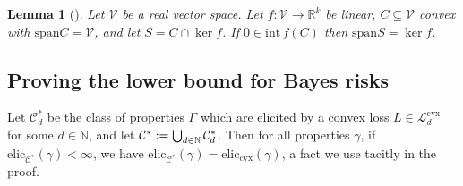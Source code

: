 \documentclass{article} %
\newcommand{\Comments}{0}
\newcommand{\mytodo}[2]{\ifnum\Comments=1%
	\todo[linecolor=#1!80!black,backgroundcolor=#1,bordercolor=#1!80!black]{#2}\fi}
\newcommand{\btw}[1]{}%
\newcommand{\reals}{\mathbb{R}}
\newcommand{\interior}{\mathrm{int}\,}
\newcommand{\elic}{\mathrm{elic}}
\newcommand{\eliccvx}{\mathrm{elic}_\mathrm{cvx}}
\newcommand{\spn}{\mathrm{span}}
\newcommand{\C}{\mathcal{C}}
\newcommand{\Lcvx}{\mathcal{L}^{\mathrm{cvx}}}
\newcommand{\V}{\mathcal{V}}
\newtheorem{lemma}{Lemma}
\begin{document}
\begin{lemma}[{\citet[Lemma 14]{frongillo2020elicitation}}]
  \label{lem:lin-alg-span}
  Let $\V$ be a real vector space.
  Let $f:\V\to\reals^k$ be linear, $C\subseteq \V$ convex with $\spn C = \V$, and let $S = C \cap \ker f$.
  If $0 \in \interior f(C)$ then $\spn S = \ker f$.
\end{lemma}

\subsection{Proving the lower bound for Bayes risks}

Let $\C^*_d$ be the class of properties $\Gamma$ which are elicited by a convex loss $L\in\Lcvx_d$ for some $d\in\mathbb{N}$, and let $\C^*\defeq \bigcup_{d\in\mathbb{N}} \C^*_d$.
Then for all properties $\gamma$, if $\elic_{\C^*}(\gamma) < \infty$, we have $\elic_{\C^*}(\gamma) = \eliccvx(\gamma)$, a fact we use tacitly in the proof.\btw{When we add the stuff on entropy and norms, we'll need to actually define $\Lcvx_{\infty}$, which is a whole other can of worms... but totally fine actually.  Fun times for later :-]}
\end{document}
